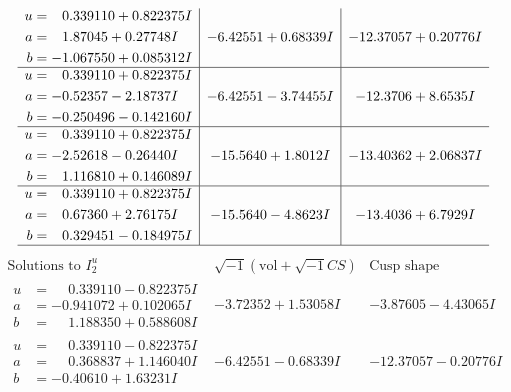 \documentclass[1p]{elsarticle_modified}
\theoremstyle{definition}
\newcommand{\I}{\sqrt{-1}}
\begin{document}
$$\begin{array}{c|c|c}
\begin{aligned}
u &= \phantom{-}0.339110 + 0.822375 I \\
a &= \phantom{-}1.87045 + 0.27748 I \\
b &= -1.067550 + 0.085312 I\end{aligned}
 & -6.42551 + 0.68339 I & -12.37057 + 0.20776 I \\ \hline\begin{aligned}
u &= \phantom{-}0.339110 + 0.822375 I \\
a &= -0.52357 - 2.18737 I \\
b &= -0.250496 - 0.142160 I\end{aligned}
 & -6.42551 - 3.74455 I & -12.3706 + 8.6535 I \\ \hline\begin{aligned}
u &= \phantom{-}0.339110 + 0.822375 I \\
a &= -2.52618 - 0.26440 I \\
b &= \phantom{-}1.116810 + 0.146089 I\end{aligned}
 & -15.5640 + 1.8012 I & -13.40362 + 2.06837 I \\ \hline\begin{aligned}
u &= \phantom{-}0.339110 + 0.822375 I \\
a &= \phantom{-}0.67360 + 2.76175 I \\
b &= \phantom{-}0.329451 - 0.184975 I\end{aligned}
 & -15.5640 - 4.8623 I & -13.4036 + 6.7929 I\\
 \hline 
 \end{array}$$\newpage$$\begin{array}{c|c|c}  
\text{Solutions to }I^u_{2}& \I (\text{vol} + \sqrt{-1}CS) & \text{Cusp shape}\\
 \hline 
\begin{aligned}
u &= \phantom{-}0.339110 - 0.822375 I \\
a &= -0.941072 + 0.102065 I \\
b &= \phantom{-}1.188350 + 0.588608 I\end{aligned}
 & -3.72352 + 1.53058 I & -3.87605 - 4.43065 I \\ \hline\begin{aligned}
u &= \phantom{-}0.339110 - 0.822375 I \\
a &= \phantom{-}0.368837 + 1.146040 I \\
b &= -0.40610 + 1.63231 I\end{aligned}
 & -6.42551 - 0.68339 I & -12.37057 - 0.20776 I \\ \hline\begin{aligned}

\end{aligned}
\end{array}$$
\end{document}
